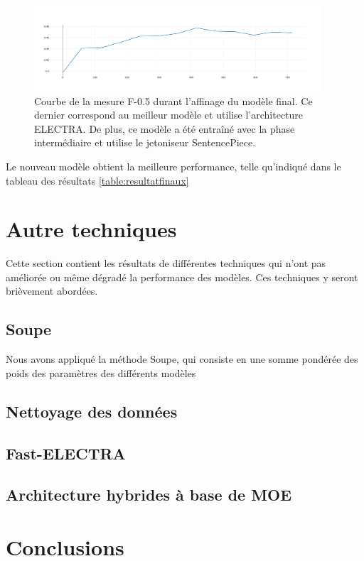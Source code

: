 \documentclass[12pt,twoside,maitrise]{dms}
\theoremstyle{definition}
\numberwithin{equation}{section}
\numberwithin{table}{chapter}
\numberwithin{figure}{chapter}
\begin{document}
\begin{figure}
	\begin{center}
		\includegraphics[width=0.95\textwidth]{figures/meilleurmodelenatf05.png}
	\end{center}
	\caption{Courbe de la mesure F-0.5 durant l'affinage du modèle final. Ce dernier correspond au meilleur modèle et utilise l'architecture ELECTRA. De plus, ce modèle a été entraîné avec la phase intermédiaire et utilise le jetoniseur SentencePiece.}\label{fig:meilleurmodeleaweb}
\end{figure}

Le nouveau modèle obtient la meilleure performance, telle qu'indiqué dans le tableau des résultats \ref{table:resultatfinaux}

\chapter{Autre techniques} \label{chapitre:autretechnique}
Cette section contient les résultats de différentes techniques qui n'ont pas
améliorée ou même dégradé la performance des modèles. Ces techniques y seront
brièvement abordées.
\section{Soupe}
Nous avons appliqué la méthode Soupe, qui consiste en une somme pondérée des poids des paramètres des différents modèles
\section{Nettoyage des données}
\section{Fast-ELECTRA}
\section{Architecture hybrides à base de MOE}
\chapter{Conclusions}
\end{document}
